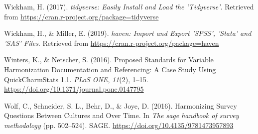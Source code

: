 \documentclass[12pt,]{article}
\begin{document}
\leavevmode\hypertarget{ref-tidyverse}{}%
Wickham, H. (2017). \emph{tidyverse: Easily Install and Load the 'Tidyverse'}. Retrieved from \url{https://cran.r-project.org/package=tidyverse}

\leavevmode\hypertarget{ref-haven}{}%
Wickham, H., \& Miller, E. (2019). \emph{haven: Import and Export 'SPSS', 'Stata' and 'SAS' Files}. Retrieved from \url{https://cran.r-project.org/package=haven}

\leavevmode\hypertarget{ref-Winters2016}{}%
Winters, K., \& Netscher, S. (2016). Proposed Standards for Variable Harmonization Documentation and Referencing: A Case Study Using QuickCharmStats 1.1. \emph{PLoS ONE}, \emph{11}(2), 1--15. \url{https://doi.org/10.1371/journal.pone.0147795}

\leavevmode\hypertarget{ref-Wolf2016}{}%
Wolf, C., Schneider, S. L., Behr, D., \& Joye, D. (2016). Harmonizing Survey Questions Between Cultures and Over Time. In \emph{The sage handbook of survey methodology} (pp. 502--524). SAGE. \url{https://doi.org/10.4135/9781473957893}
\end{document}
